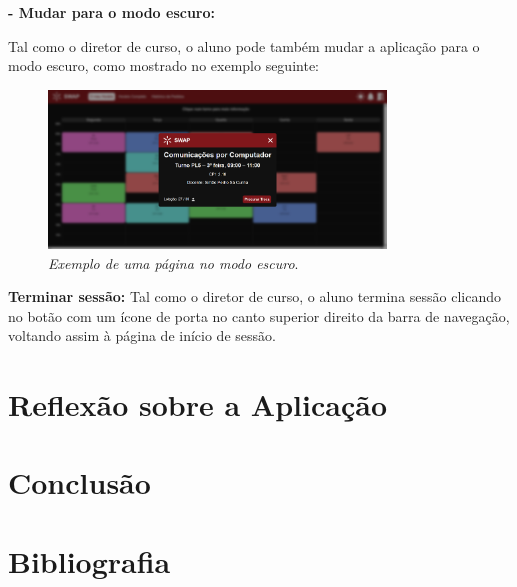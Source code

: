 \documentclass[12pt, a4paper]{article}
\begin{document}
\textbf{- Mudar para o modo escuro:}

Tal como o diretor de curso, o aluno pode também mudar a aplicação para o modo escuro,
como mostrado no exemplo seguinte:

\begin{figure}[H]
    \centering
    \includegraphics[width=0.8\textwidth]{res/manual/exemplo_modo_escuro_aluno.png}
    \caption{\emph{Exemplo de uma página no modo escuro}.}
    \label{exemplo_modo_escuro_aluno}
\end{figure}

\textbf{Terminar sessão:}
Tal como o diretor de curso, o aluno termina sessão clicando no botão com um ícone de porta no
canto superior direito da barra de navegação, voltando assim à página de início de sessão.

\section{Reflexão sobre a Aplicação}

\section{Conclusão}

\begingroup
\section{Bibliografia}
\renewcommand{\section}[2]{}
\end{document}
